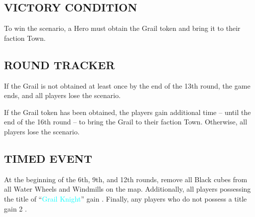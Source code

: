 \begin{multicols*}{2}
\subsection*{\MakeUppercase{Victory Condition}}
To win the scenario, a Hero must obtain the Grail token and bring it to their faction Town.
\subsection*{\MakeUppercase{Round Tracker}}
If the Grail is not obtained at least once by the end of the 13th round, the game ends, and all players lose the scenario.

If the Grail token has been obtained, the players gain additional time – until the end of the 16th round – to bring the Grail to their faction Town. Otherwise, all players lose the scenario.
\subsection*{\MakeUppercase{Timed Event}}
At the beginning of the 6th, 9th, and 12th rounds, remove all Black cubes from all Water Wheels and Windmills on the map. Additionally, all players possessing the title of “\textcolor{cyan}{Grail Knight}” gain . Finally, any players who do not possess a title gain 2 .
\end{multicols*}
